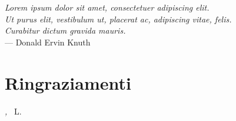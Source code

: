 
\cleardoublepage
{}
{}

\begin{flushright}{\slshape    
	Lorem ipsum dolor sit amet, consectetuer adipiscing elit. \\
	Ut purus elit, vestibulum ut, placerat ac, adipiscing vitae, felis. \\
	Curabitur dictum gravida mauris.} \\ \medskip
    --- Donald Ervin Knuth
\end{flushright}


\bigskip

\begingroup
\let\clearpage\relax
\let\cleardoublepage\relax
\let\cleardoublepage\relax

\chapter*{Ringraziamenti}

\lipsum[1]

\bigskip
 
\noindent\textit{\mylocation, \MakeTextLowercase{\mytime}}
\hfill ~L.

\endgroup
